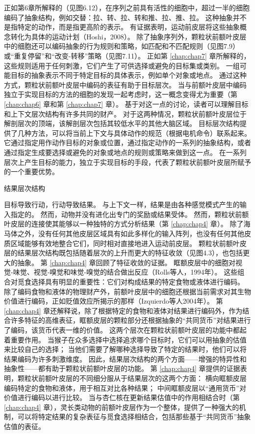 正如第6章所解释的（见图6.12），在序列之前具有活性的细胞中，超过一半的细胞编码了抽象结构，例如交替：拉、转、拉、转和推、拉、推、拉。
这种抽象并不是指特定的动作，而是指更高阶的表示。
有证据表明，运动前皮层将这些抽象概念转化为具体的运动计划（Hoshi，2008）。
除了抽象序列外，颗粒状前额叶皮层中的细胞还可以编码抽象的行为规则和策略，如匹配和不匹配规则（见图7.9）或“重复停留”和“改变-转移”策略（见图7.11）。
正如第 \ref{chap:chap7} 章所解释的，这些规则适用于任何刺激，它们产生了可供选择或避免的目标集或类别。
一组可能目标的抽象表示不同于特定目标的具体表示，例如单个对象或地点。
通过这种方式，颗粒状前额叶皮层中编码的表征有助于目标层次。
当与前额叶皮层中编码独立于实现目标的方法的细胞的发现一起考虑时，这一概念变得尤为重要（第 \ref{chap:chap6} 章和第 \ref{chap:chap7} 章）。
基于对这一点的讨论，读者可以理解目标和上下文层次结构有许多共同的财产。
对于这两种情况，颗粒状前额叶皮层位于解剖层次的顶端，该解剖层次包括其较低水平的其他大脑区域。
目标层次结构提供了几种方法，可以将当前上下文与具体动作的规范（根据电机命令）联系起来。
它通过指定用作动作目标的对象或位置，通过指定动作的一系列的抽象结构，或者通过指定生成要选择或避免的对象或地点的规则或策略来做到这一点。
在一系列层次上产生目标的能力，独立于实现目标的手段，代表了颗粒状前额叶皮层所赋予的一个重要优势。



结果层次结构

目标导致行动，行动导致结果。
与上下文一样，结果是由各种感觉模式产生的输入指定的。
然而，动物并没有进化出专门的奖励或结果受体。
然而，颗粒状前额叶皮层的连接使其能够以一种独特的方式分析结果（第 \ref{chap:chap4} 章）。
除了海马体之外，没有任何其他皮层区域具有如此多样化的输入阵列，也没有任何其他皮质区域能够有效地整合它们，同时相对直接地进入运动前皮层。
颗粒状前额叶皮层的结果层次结构既包括随着层次的上升而更大的特征收敛（见图4.3），也包括更大的抽象。
第 \ref{chap:chap4} 章回顾了特征收敛的证据。
眶额皮层中的细胞对视觉-味觉、视觉-嗅觉和味觉-嗅觉的结合做出反应（Rolls等人，1994年）。
这些组合对觅食选择具有明显的重要性：它们对构成结果的特定食物或液体进行编码。
除了编码食物和液体的物理财产外，前额叶皮层中的细胞还根据当前需求对其生物价值进行编码，正如贬值效应所揭示的那样（Izquierdo等人2004年）。
第 \ref{chap:chap4} 章还解释说，除了根据特定的食物和液体对结果进行编码外，作为结合许多特征的高维表征，眶额皮层的颗粒部分还根据抽象的“共同货币”对结果进行了编码，该货币代表一维的价值。
这两个层次在颗粒状前额叶皮层的功能中都起着重要作用。
当猴子在众多选择中选择追求哪个目标时，它们可以用抽象的估值来比较自己的选择；
当他们需要了解哪种选择导致了特定的结果时，他们可以将结果编码为许多刺激维度。
因此，结果层次结构的两个方面——增强的特异性和抽象性——都有助于颗粒状前额叶皮层的功能。
第 \ref{chap:chap4} 章提供的证据表明，颗粒状前额叶皮层的不同细分服从于结果层次的这两个方面：
横向眶额皮层编码特定的食物和液体，用于相互对比各种结果；
中间眶额皮层以“通用货币”对价值进行编码以进行比较。
当与杏仁核在更新结果估值中的作用相结合时（第 \ref{chap:chap4} 章），灵长类动物的前额叶皮层作为一个整体，提供了一种强大的机制，可以将特定结果的复杂表征与觅食选择相结合，包括那些基于“共同货币”抽象估值的表征。



